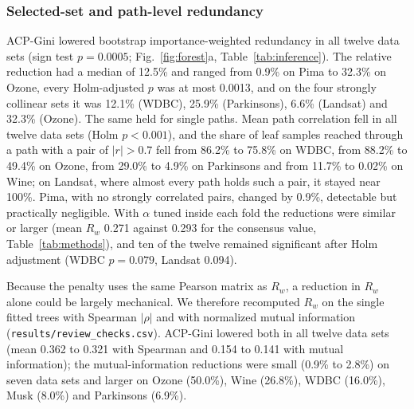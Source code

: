 \documentclass[pdflatex,sn-basic,Numbered]{sn-jnl}
\begin{document}
\begin{table}[!htbp]\centering\caption{Accuracy change of ACP-Gini relative to CART (percentage points) with 95\% corrected-resampled intervals, for the consensus $\alpha$ and for $\alpha$ tuned inside each outer fold.}\label{tab:noninf}\scriptsize\end{table}
\begin{table}[!htbp]\centering\caption{Mean over the twelve data sets of the per-data-set fold means. Bold marks a proposed-method value that is better than every baseline; redundancy and path columns are lower-is-better. Group corr. is the group-level importance rank correlation, $R_w$ the bootstrap importance-weighted redundancy and Path $|r|$ the bootstrap path correlation.}\label{tab:methods}\tiny\setlength{\tabcolsep}{2pt}\end{table}

\subsubsection{Selected-set and path-level redundancy}
ACP-Gini lowered bootstrap importance-weighted redundancy in all twelve data sets (sign test $p=0.0005$; Fig.~\ref{fig:forest}a, Table~\ref{tab:inference}). The relative reduction had a median of 12.5\% and ranged from 0.9\% on Pima to 32.3\% on Ozone, every Holm-adjusted $p$ was at most 0.0013, and on the four strongly collinear sets it was 12.1\% (WDBC), 25.9\% (Parkinsons), 6.6\% (Landsat) and 32.3\% (Ozone). The same held for single paths. Mean path correlation fell in all twelve data sets (Holm $p<0.001$), and the share of leaf samples reached through a path with a pair of $|r|>0.7$ fell from 86.2\% to 75.8\% on WDBC, from 88.2\% to 49.4\% on Ozone, from 29.0\% to 4.9\% on Parkinsons and from 11.7\% to 0.02\% on Wine; on Landsat, where almost every path holds such a pair, it stayed near 100\%. Pima, with no strongly correlated pairs, changed by 0.9\%, detectable but practically negligible. With $\alpha$ tuned inside each fold the reductions were similar or larger (mean $R_w$ 0.271 against 0.293 for the consensus value, Table~\ref{tab:methods}), and ten of the twelve remained significant after Holm adjustment (WDBC $p=0.079$, Landsat 0.094).

Because the penalty uses the same Pearson matrix as $R_w$, a reduction in $R_w$ alone could be largely mechanical. We therefore recomputed $R_w$ on the single fitted trees with Spearman $|\rho|$ and with normalized mutual information (\texttt{results/review\_checks.csv}). ACP-Gini lowered both in all twelve data sets (mean 0.362 to 0.321 with Spearman and 0.154 to 0.141 with mutual information); the mutual-information reductions were small (0.9\% to 2.8\%) on seven data sets and larger on Ozone (50.0\%), Wine (26.8\%), WDBC (16.0\%), Musk (8.0\%) and Parkinsons (6.9\%).
\end{document}

